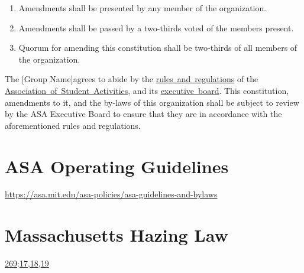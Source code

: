 \documentclass{constitution}
\def\groupname{[Group Name]}
\begin{document}
\begin{enumerate}
    \item Amendments shall be presented by any member of the organization.

    \item Amendments shall be passed by a two-thirds voted of the members present.

    \item Quorum for amending this constitution shall be two-thirds of all members of the organization.
\end{enumerate}

The \groupname agrees to abide by the \href{https://asa.mit.edu/asa-policies}{rules~and~regulations} of the \href{https://asa.mit.edu/}{Association~of~Student~Activities}, and its \href{https://asa.mit.edu/about-asa/board-members}{executive~board}.
This constitution, amendments to it, and the by-laws of this organization shall be subject to review by the ASA Executive Board to ensure that they are in accordance with the aforementioned rules and regulations.

\section{ASA Operating Guidelines}
\url{https://asa.mit.edu/asa-policies/asa-guidelines-and-bylaws}

\section{Massachusetts Hazing Law}
\href{https://malegislature.gov/Laws/GeneralLaws/PartIV/TitleI/Chapter269}{269}:\href{https://malegislature.gov/Laws/GeneralLaws/PartIV/TitleI/Chapter269/Section17}{17},\href{https://malegislature.gov/Laws/GeneralLaws/PartIV/TitleI/Chapter269/Section18}{18},\href{https://malegislature.gov/Laws/GeneralLaws/PartIV/TitleI/Chapter269/Section19}{19}
\end{document}
